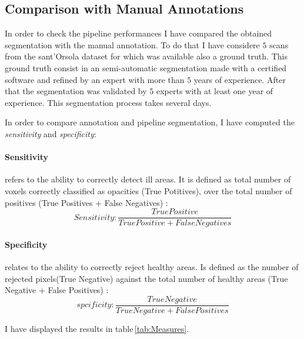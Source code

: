 \documentclass{standalone}
\begin{document}
	\subsection{Comparison with Manual Annotations}
	
	In order to check the pipeline performances I have compared the  obtained segmentation with the manual annotation. To do that I have considere $5$ scans from the sant'Orsola dataset for which was available also a ground truth. This ground truth consist in an semi-automatic segmentation made with a certified software and refined by an expert with more than $5$ years of experience. After that the segmentation was validated by $5$ experts with at least one year of experience. This segmentation process takes several days. 
	
	In order to compare annotation and pipeline segmentation, I have computed the \emph{sensitivity} and \emph{specificity}: 
	
	\paragraph{Sensitivity} refers to the ability to correctly detect ill areas. It is defined as total number of voxels correctly classified as opacities (True Potitives), over the total number of positives (True Positives + False Negatives) : 
	\begin{equation}\label{eq:sensitivity}
		Sensitivity : \frac{True Positive}{True Positive + False Negatives}
	\end{equation}

	\paragraph{Specificity} relates to the  ability to correctly reject healthy areas. Is defined as the number of rejected pixels(True Negative) against the total number of healthy areas (True Negative + False Positives) : 
	\begin{equation}
		spcificity : \frac{True Negative}{True Negative + False Positives}
	\end{equation}

	I have displayed the results in table\,\ref{tab:Measures}. 
	
\end{document}
